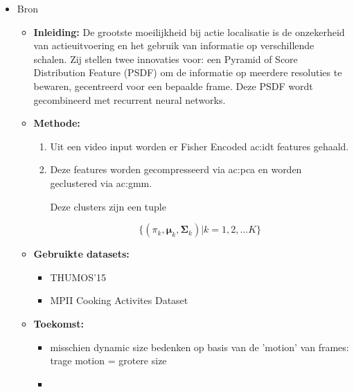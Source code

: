 \begin{itemize}
	\item Bron \cite{Yuan2016}
	\begin{itemize}
		\item \textbf{Inleiding:} De grootste moeilijkheid bij actie localisatie is de onzekerheid van actieuitvoering en het gebruik van informatie op verschillende schalen. Zij stellen twee innovaties voor: een Pyramid of Score Distribution Feature (PSDF) om de informatie op meerdere resoluties te bewaren, gecentreerd voor een bepaalde frame. Deze PSDF wordt gecombineerd met recurrent neural networks. 
		\item \textbf{Methode:}
		\begin{enumerate}
			\item Uit een video input worden er Fisher Encoded \gls{ac:idt} features gehaald.
			\item Deze features worden gecompresseerd via \gls{ac:pca} en worden geclustered via \gls{ac:gmm}.
	
		 	Deze clusters zijn een tuple
		 	
		 	$$\{ (\pi_k, \mathbf{\mu}_k, \mathbf{\Sigma}_k) | k = 1, 2, ... K\}$$
		\end{enumerate}
		\item \textbf{Gebruikte datasets:}
		\begin{itemize}
			\item THUMOS'15
			\item MPII Cooking Activites Dataset
		\end{itemize}
	
		\item \textbf{Toekomst:}
		\begin{itemize}
			\item {\color{red}misschien dynamic size bedenken op basis van de 'motion' van frames: trage motion = grotere size}
		\end{itemize}
		\begin{itemize}
			\item 
		\end{itemize}
	\end{itemize}
\end{itemize}




